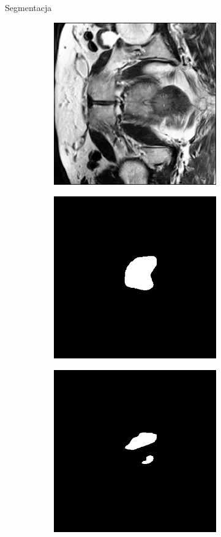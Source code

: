 \documentclass[final]{beamer}
\newlength{\onecolwid}
\newlength{\threecolwid}
\begin{document}
\begin{frame}[t]
\begin{columns}[t]
\begin{column}{\threecolwid}
\begin{columns}[t,totalwidth=\threecolwid]
\begin{column}{\onecolwid}
\begin{block}{Segmentacja}
\begin{figure}[htb]
                    \medskip
                    \begin{subfigure}{}
                        \includegraphics[width=7cm,angle=270,origin=c]{../segmentation/segmentation_train_2.png}
                        \label{fig:4}
                    \end{subfigure}\hfil %
                    \begin{subfigure}{}
                        \includegraphics[width=7cm,angle=270,origin=c]{../segmentation/pred_mask_2.png}
                        \label{fig:5}
                    \end{subfigure}\hfil %
                    \begin{subfigure}{}
                        \includegraphics[width=7cm,angle=270,origin=c]{../segmentation/segmentation_mask_2.png}

\end{subfigure}
\end{figure}
\end{block}
\end{column}
\end{columns}
\end{column}
\end{columns}
\end{frame}
\end{document}
